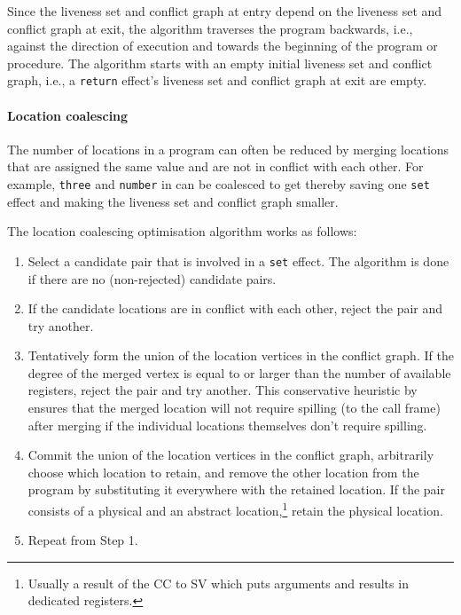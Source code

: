 \documentclass[main.tex]{subfiles}
\begin{document}
Since the liveness set and conflict graph at entry depend on the liveness set and conflict graph at exit, the algorithm traverses the program backwards, i.e., against the direction of execution and towards the beginning of the program or procedure. The algorithm starts with an empty initial liveness set and conflict graph, i.e., a \texttt{return} effect's liveness set and conflict graph at exit are empty.

\paragraph{Location coalescing} The number of locations in a program can often be reduced by merging locations that are assigned the same value and are not in conflict with each other. For example, \texttt{three} and \texttt{number} in
can be coalesced to get
thereby saving one \texttt{set} effect and making the liveness set and conflict graph smaller.

The location coalescing optimisation algorithm works as follows:
\begin{enumerate}
	\item Select a candidate pair that is involved in a \texttt{set} effect. The algorithm is done if there are no (non-rejected) candidate pairs.
	\item If the candidate locations are in conflict with each other, reject the pair and try another.
	\item Tentatively form the union of the location vertices in the conflict graph. If the degree of the merged vertex is equal to or larger than the number of available registers, reject the pair and try another. This conservative heuristic by \cite{briggs} ensures that the merged location will not require spilling (to the call frame) after merging if the individual locations themselves don't require spilling.
	\item Commit the union of the location vertices in the conflict graph, arbitrarily choose which location to retain, and remove the other location from the program by substituting it everywhere with the retained location. If the pair consists of a physical and an abstract location,\footnote{Usually a result of the CC to SV  which puts arguments and results in dedicated registers.} retain the physical location.
	\item Repeat from Step 1.
\end{enumerate}
\end{document}
